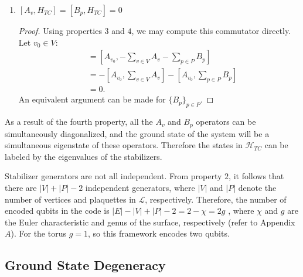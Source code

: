 \documentclass[12pt]{article}
\theoremstyle{definition}
\begin{document}
\begin{enumerate}
\begin{proof}
\begin{align}
                        &= B_{p_0}A_{v_0}|\xi\rangle.
                    \end{align}
                Therefore $[A_{v_0},B_{p_0}] = 0$. Note that in $(13)$ and $(15)$ we used the property $\{\sigma^x_e,\sigma^z_{e'}\} = 0$ for $e = e'$, and throughout our reasoning we applied the fact $[\sigma^x_e,\sigma^z_{e'}] = 0$ if $e\neq e'$.
            \end{proof}\newpage
        \item $[A_v,H_{TC}] = [B_p,H_{TC}] = 0$
            \begin{proof}
                Using properties $3$ and $4$, we may compute this commutator directly. Let $v_0\in V$:
                    \begin{align}
                        [A_{v_0},H_{TC}] &= [A_{v_0},-\sum_{v\in V}A_v-\sum_{p\in P}B_p]\\
                        &= -[A_{v_0},\sum_{v\in V}A_v]-[A_{v_0},\sum_{p\in P}B_p]\\
                        &= 0.
                    \end{align}
                An equivalent argument can be made for $\{B_{p}\}_{p\in P}$.
            \end{proof}
    \end{enumerate}
As a result of the fourth property, all the $A_v$ and $B_p$ operators can be simultaneously diagonalized, and the ground state of the system will be a simultaneous eigenstate of these operators. Therefore the states in $\mathcal{H}_{TC}$ can be labeled by the eigenvalues of the stabilizers.\newline

Stabilizer generators are not all independent. From property $2$, it follows that there are $|V|+|P|-2$ independent generators, where $|V|$ and $|P|$ denote the number of vertices and plaquettes in $\mathcal{L}$, respectively. Therefore, the number of encoded qubits in the code is $|E|-|V|+|P|-2 = 2-\chi = 2g$ \cite{anintro}, where $\chi$ and $g$ are the Euler characteristic and genus of the surface, respectively (refer to Appendix $A$). For the torus $g = 1$, so this framework encodes two qubits.

\subsection{Ground State Degeneracy}
\end{document}
